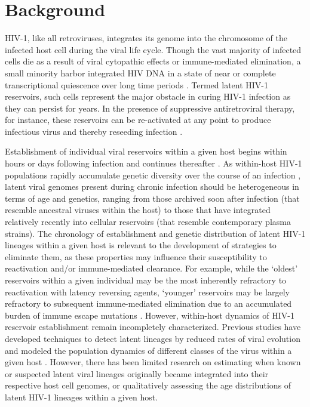 \documentclass[12pt]{article}
\begin{document}
\underline{}
\section * {Background} \label{sec:intro}

HIV-1, like all retroviruses, integrates its genome into the chromosome of the infected host cell during the viral life cycle.
Though the vast majority of infected cells die as a result of viral cytopathic effects or immune-mediated elimination, a small minority \citep[broadly estimated as one in every million resting CD4+ T-cells;][]{Chun97,Finzi97} harbor integrated HIV DNA in a state of near or complete transcriptional quiescence over long time periods \citep{Archin14,Pace11,Richman09}.
Termed latent HIV-1 reservoirs, such cells represent the major obstacle in curing HIV-1 infection as they can persist for years.
In the presence of suppressive antiretroviral therapy, for instance, these reservoirs can be re-activated at any point to produce infectious virus and thereby reseeding infection \citep{Durand12,Joos08,Katlama13,Pomerantz03,Shen08,Richman09}. 

Establishment of individual viral reservoirs within a given host  begins within hours or days following infection and continues thereafter \citep{Whitney14,Leford14}.
As within-host HIV-1 populations rapidly accumulate genetic diversity over the course of an infection \citep{Alizon13,Rambaut04,Shankarappa99}, latent viral genomes present during chronic infection should be heterogeneous in terms of age and genetics, ranging from those archived soon after infection (that resemble ancestral viruses within the host) to those that have integrated relatively recently into cellular reservoirs (that resemble contemporary plasma strains).
The chronology of establishment and genetic distribution of latent HIV-1 lineages within a given host is relevant to the development of strategies to eliminate them, as these properties may influence their susceptibility to reactivation and/or immune-mediated clearance.
For example, while the `oldest' reservoirs within a given individual may be the most inherently refractory to reactivation with latency reversing agents, `younger' reservoirs may be largely refractory to subsequent immune-mediated elimination due to an accumulated burden of immune escape mutations \citep{Deng15}.
However, within-host dynamics of HIV-1 reservoir establishment remain incompletely characterized.
Previous studies have developed techniques to detect latent lineages by reduced rates of viral evolution \citep{Immonen14} and modeled the population dynamics of different classes of the virus within a given host \citep{Althaus14}.
However, there has been limited research on estimating when known or suspected latent viral lineages originally became integrated into their respective host cell genomes, or qualitatively assessing the age distributions of latent HIV-1 lineages within a given host.  
\end{document}
